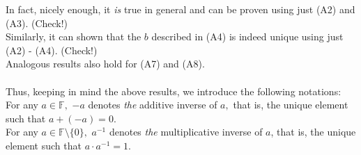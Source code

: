 \documentclass[12pt]{article}
\begin{document}
In fact, nicely enough, it \emph{is} true in general and can be proven using just (A2) and (A3). (Check!)\\
Similarly, it can shown that the $b$ described in (A4) is indeed unique using just (A2) - (A4). (Check!)\\
Analogous results also hold for (A7) and (A8).\\~\\
Thus, keeping in mind the above results, we introduce the following notations:\\
For any $a \in \mathbb{F},$ $-a$ denotes \emph{the} additive inverse of $a,$ that is, the unique element such that $a + (-a) = 0.$\\
For any $a \in \mathbb{F}\setminus\{0\},$ $a^{-1}$ denotes \emph{the} multiplicative inverse of $a$, that is, the unique element such that $a \cdot a^{-1} = 1.$
\end{document}
